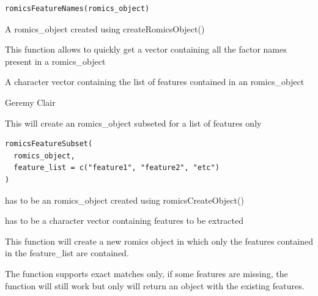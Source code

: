 \documentclass[a4paper]{book}
\begin{document}
%
\begin{Usage}
\begin{verbatim}
romicsFeatureNames(romics_object)
\end{verbatim}
\end{Usage}
%
\begin{Arguments}
\begin{ldescription}
\item[\code{romics\_object}] A romics\_object created using createRomicsObject()
\end{ldescription}
\end{Arguments}
%
\begin{Details}
This function allows to quickly get a vector containing all the factor names present in a romics\_object
\end{Details}
%
\begin{Value}
A character vector containing the list of features contained in an romics\_object
\end{Value}
%
\begin{Author}
Geremy Clair
\end{Author}
%
\begin{Description}
This will create an romics\_object subseted for a list of features only
\end{Description}
%
\begin{Usage}
\begin{verbatim}
romicsFeatureSubset(
  romics_object,
  feature_list = c("feature1", "feature2", "etc")
)
\end{verbatim}
\end{Usage}
%
\begin{Arguments}
\begin{ldescription}
\item[\code{romics\_object}] has to be an romics\_object created using romicsCreateObject()

\item[\code{feature\_list}] has to be a character vector containing features to be extracted
\end{ldescription}
\end{Arguments}
%
\begin{Details}
This function will create a new romics object in which only the features contained in the feature\_list are contained.

The function supports exact matches only, if some features are missing, the function will still work but only will return an object with the existing features.
\end{Details}
\end{document}

